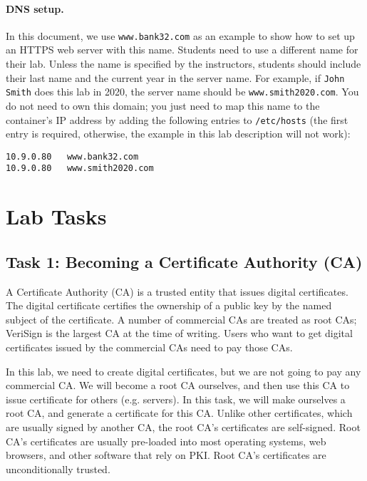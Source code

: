 \paragraph{DNS setup.} In this document, we use \texttt{www.bank32.com} 
as an example to show how to set up an HTTPS web server with this name. 
Students need to use a different name for their lab. Unless the name
is specified by the instructors, students should 
include their last name and the current year in the server name. 
For example, if \texttt{John Smith} does this lab in 2020,
the server name should be \texttt{www.smith2020.com}. You do not need to
own this domain; you just need to map this name to the container's
IP address by adding the following entries to
\texttt{/etc/hosts} (the first entry is required, otherwise, the example
in this lab description will not work):

\begin{lstlisting}
10.9.0.80   www.bank32.com
10.9.0.80   www.smith2020.com
\end{lstlisting}
 



\section{Lab Tasks}


\subsection{Task 1: Becoming a Certificate Authority (CA)}

A Certificate Authority (CA) is a trusted entity that issues digital certificates. 
The digital certificate certifies the ownership of a public key by 
the named subject of the certificate. A number of commercial 
CAs are treated as root CAs; VeriSign is the largest CA at the time of 
writing. Users who want to get digital certificates issued
by the commercial CAs need to pay those CAs.


In this lab, we need to create digital certificates, but we are not going to pay
any commercial CA. We will become a root CA ourselves, and then use this CA to 
issue certificate for others (e.g. servers). In this task, we will make
ourselves a root CA, and generate a certificate for this CA. Unlike 
other certificates, which are usually signed by another CA, the root CA's 
certificates are self-signed. Root CA's certificates are usually pre-loaded
into most operating systems, web browsers, and other software that rely on PKI.
Root CA's certificates are unconditionally trusted.


